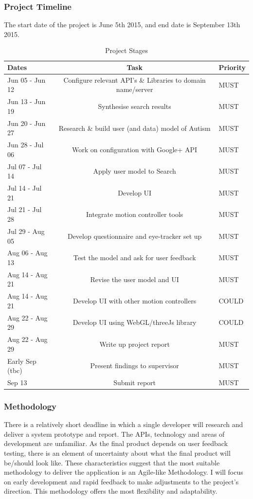 \documentclass[a4paper, 11pt]{article}
\begin{document}
\subsubsection{Project Timeline}
The start date of the project is June 5th 2015, and end date is September 13th 2015. 
\begin{table}[h]
\caption{Project Stages} 
\centering
\begin{tabular}{ L |c| L}
\hline\hline 
Dates & Task & Priority\\ [0.5ex]
\hline 
Jun 05 - Jun 12 & Configure relevant API's \& Libraries to domain name/server & MUST\\
\hline 
Jun 13 - Jun 19 & Synthesise search results & MUST\\
\hline 
Jun 20 - Jun 27 & Research \& build user (and data) model of Autism & MUST\\
\hline 
Jun 28 - Jul 06 & Work on configuration with Google+ API & MUST\\
\hline 
Jul 07 - Jul 14 & Apply user model to Search& MUST\\ 
\hline 
Jul 14 - Jul 21 & Develop UI & MUST\\
\hline 
Jul 21 - Jul 28 & Integrate motion controller tools& MUST\\
\hline 
Jul 29 - Aug 05 & Develop questionnaire and eye-tracker set up & MUST\\ 
\hline 
Aug 06 - Aug 13 & Test the model and ask for user feedback & MUST\\
\hline 
Aug 14 - Aug 21 & Revise the user model and UI & MUST\\
\hline 
Aug 14 - Aug 21 & Develop UI with other motion controllers & COULD\\
\hline 
Aug 22 - Aug 29 & Develop UI using WebGL/threeJs library & COULD\\
\hline 
Aug 22 - Aug 29 & Write up project report & MUST\\ 
\hline 
Early Sep (tbc) & Present findings to supervisor & MUST\\
\hline 
Sep 13 & Submit report & MUST\\[1ex]
\hline
\end{tabular}
\label{stages} 
\end{table}

\subsubsection{Methodology}
There is a relatively short deadline in which a single developer will research and deliver a system prototype and report. The APIs, technology and areas of development are unfamiliar. As the final product depends on user feedback testing, there is an element of uncertainty about what the final product will be/should look like. These characteristics suggest that the most suitable methodology to deliver the application is an Agile-like Methodology. I will focus on early development and rapid feedback to make adjustments to the project's direction. This methodology offers the most flexibility and adaptability.
\end{document}
